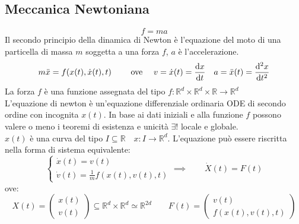 \subsection{Meccanica Newtoniana}
\begin{equation}
    f = m a 
\end{equation}
Il secondo principio della dinamica di Newton è l'equazione del moto di una particella di massa $m$ 
soggetta a una forza $f$, $a$ è l'accelerazione.\\ 
\begin{equation}
    m \ddot{x} = f( x(t),\dot{x}(t), t) \qquad \text{ ove } \quad v = \dot{x}(t) = \dv{x}{t}\quad a = \ddot{x}(t)= \dv[2]{x}{t}
\end{equation}
La forza $f$ è una funzione assegnata del tipo $f: \mathbb{R}^d\times \mathbb{R}^d \times \mathbb{R} \rightarrow \mathbb{R}^d$\\
L'equazione di newton è un'equazione differenziale ordinaria ODE di secondo ordine con incognita $x(t)$. 
In base ai dati iniziali e alla funzione $f$ possono valere o meno i teoremi di esistenza e unicità $\exists!$ locale e globale.\\ 
$x(t)$ è una curva del tipo $I \subseteq \mathbb{R}\quad x: I \rightarrow \mathbb{R}^d $. L'equazione può essere 
riscritta nella forma di sistema equivalente:
\begin{equation}
    \begin{cases}
        \dot{x}(t) = v(t)\\ 
        \dot{v}(t) =\frac{1}{m} f( x(t), v(t), t)
    \end{cases}
    \implies
    \qquad
    \dot{X}(t)= F(t)
\end{equation}
ove:
\begin{equation*}
    X (t) = \begin{pmatrix}
        x (t) \\ 
        v (t)
    \end{pmatrix} \subseteq \mathbb{R}^d \times \mathbb{R}^d \simeq \mathbb{R}^{2d} \qquad
    F (t) = \begin{pmatrix}
        v(t) \\
        f(x(t), v(t),t)
    \end{pmatrix}
\end{equation*}
